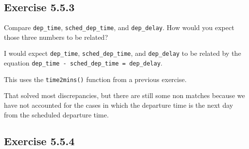\documentclass[]{book}
\newenvironment{Shaded}{\begin{snugshade}}{\end{snugshade}}
\newcommand{\CommentTok}[1]{\textcolor[rgb]{0.56,0.35,0.01}{\textit{#1}}}
\newcommand{\DataTypeTok}[1]{\textcolor[rgb]{0.13,0.29,0.53}{#1}}
\newcommand{\KeywordTok}[1]{\textcolor[rgb]{0.13,0.29,0.53}{\textbf{#1}}}
\newcommand{\NormalTok}[1]{#1}
\newcommand{\OperatorTok}[1]{\textcolor[rgb]{0.81,0.36,0.00}{\textbf{#1}}}
\newcommand{\StringTok}[1]{\textcolor[rgb]{0.31,0.60,0.02}{#1}}
\theoremstyle{plain}
\theoremstyle{remark}
\begin{document}
\hypertarget{exercise-5.5.3}{%
\subsection*{\texorpdfstring{Exercise
{5.5.3}}{Exercise 5.5.3}}\label{exercise-5.5.3}}

Compare \texttt{dep\_time}, \texttt{sched\_dep\_time}, and
\texttt{dep\_delay}. How would you expect those three numbers to be
related?

I would expect \texttt{dep\_time}, \texttt{sched\_dep\_time}, and
\texttt{dep\_delay} to be related by the equation
\texttt{dep\_time\ -\ sched\_dep\_time\ =\ dep\_delay}.

\begin{Shaded}
\end{Shaded}

This uses the \texttt{time2mins()} function from a previous exercise.

That solved most discrepancies, but there are still some non matches
because we have not accounted for the cases in which the departure time
is the next day from the scheduled departure time.

\hypertarget{exercise-5.5.4}{%
\subsection*{\texorpdfstring{Exercise
{5.5.4}}{Exercise 5.5.4}}\label{exercise-5.5.4}}
\end{document}
